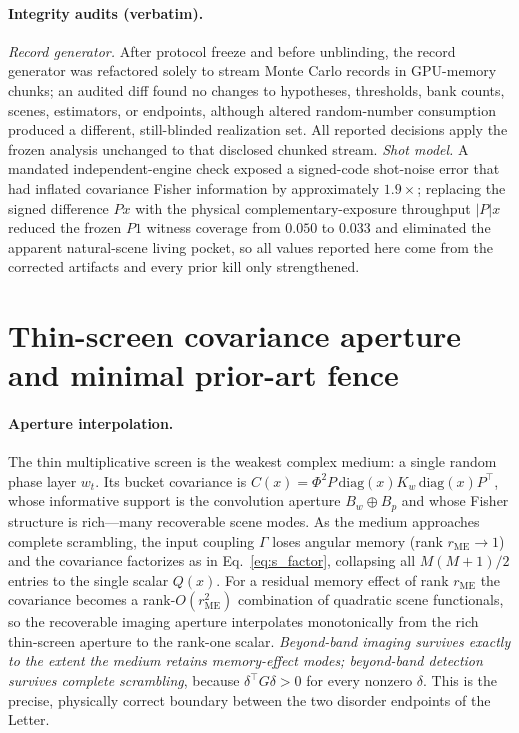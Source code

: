 \documentclass[aps,prl,onecolumn,notitlepage,nofootinbib,superscriptaddress]{revtex4-2}
\begin{document}
\paragraph*{Integrity audits (verbatim).}
\emph{Record generator.} After protocol freeze and before unblinding, the record
generator was refactored solely to stream Monte Carlo records in GPU-memory
chunks; an audited diff found no changes to hypotheses, thresholds, bank counts,
scenes, estimators, or endpoints, although altered random-number consumption
produced a different, still-blinded realization set. All reported decisions apply
the frozen analysis unchanged to that disclosed chunked stream.
\emph{Shot model.} A mandated independent-engine check exposed a signed-code
shot-noise error that had inflated covariance Fisher information by approximately
$1.9\times$; replacing the signed difference $Px$ with the physical
complementary-exposure throughput $|P|x$ reduced the frozen $P1$ witness coverage
from $0.050$ to $0.033$ and eliminated the apparent natural-scene living pocket,
so all values reported here come from the corrected artifacts and every prior
kill only strengthened.

\section{Thin-screen covariance aperture and minimal prior-art fence}
\paragraph*{Aperture interpolation.}
The thin multiplicative screen is the weakest complex medium: a single random
phase layer $w_t$. Its bucket covariance is
$C(x)=\Phi^2 P\,\mathrm{diag}(x)K_w\,\mathrm{diag}(x)P^{\!\top}$, whose informative
support is the convolution aperture $B_w\oplus B_p$ and whose Fisher structure is
rich---many recoverable scene modes. As the medium approaches complete
scrambling, the input coupling $\Gamma$ loses angular memory
(rank $r_{\mathrm{ME}}\to1$) and the covariance factorizes as in
Eq.~\eqref{eq:s_factor}, collapsing all $M(M+1)/2$ entries to the single scalar
$Q(x)$. For a residual memory effect of rank $r_{\mathrm{ME}}$ the covariance
becomes a rank-$O(r_{\mathrm{ME}}^2)$ combination of quadratic scene functionals,
so the recoverable imaging aperture interpolates monotonically from the rich
thin-screen aperture to the rank-one scalar. \emph{Beyond-band imaging survives
exactly to the extent the medium retains memory-effect modes; beyond-band
detection survives complete scrambling}, because $\delta^{\!\top}G\delta>0$ for
every nonzero $\delta$. This is the precise, physically correct boundary between
the two disorder endpoints of the Letter.
\end{document}
